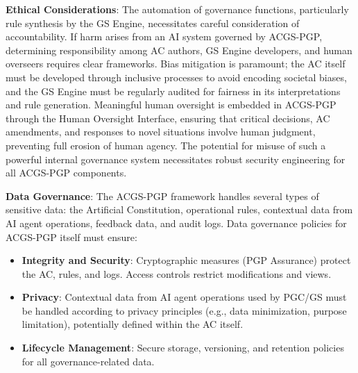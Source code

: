 \documentclass[sigconf,review,anonymous=false]{acmart} %
\begin{document}
\textbf{Ethical Considerations}: The automation of governance functions, particularly rule synthesis by the GS Engine, necessitates careful consideration of accountability. If harm arises from an AI system governed by ACGS-PGP, determining responsibility among AC authors, GS Engine developers, and human overseers requires clear frameworks. Bias mitigation is paramount; the AC itself must be developed through inclusive processes to avoid encoding societal biases, and the GS Engine must be regularly audited for fairness in its interpretations and rule generation. Meaningful human oversight is embedded in ACGS-PGP through the Human Oversight Interface, ensuring that critical decisions, AC amendments, and responses to novel situations involve human judgment, preventing full erosion of human agency. The potential for misuse of such a powerful internal governance system necessitates robust security engineering for all ACGS-PGP components.

\textbf{Data Governance}: The ACGS-PGP framework handles several types of sensitive data: the Artificial Constitution, operational rules, contextual data from AI agent operations, feedback data, and audit logs. Data governance policies for ACGS-PGP itself must ensure:
\begin{itemize}
    \item \textbf{Integrity and Security}: Cryptographic measures (PGP Assurance) protect the AC, rules, and logs. Access controls restrict modifications and views.
    \item \textbf{Privacy}: Contextual data from AI agent operations used by PGC/GS must be handled according to privacy principles (e.g., data minimization, purpose limitation), potentially defined within the AC itself.
    \item \textbf{Lifecycle Management}: Secure storage, versioning, and retention policies for all governance-related data.
\end{itemize}
\end{document}
